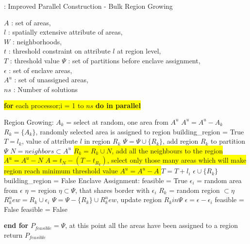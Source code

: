 \documentclass[conference]{IEEEtran}
\begin{document}
\begin{algorithm}
\renewcommand{\thealgorithm}{}
\scriptsize
\caption{: Improved Parallel Construction - Bulk Region Growing~\cite{r1}}
$A$ : set of areas,\\
$l$ : spatially extensive attribute of areas,\\
$W$ : neighborhoods,\\
$t$ : threshold constraint on attribute $l$ at region level,\\
$T$ : threshold value
$\Psi$ : set of partitions before enclave assignment,\\
$\epsilon$ : set of enclave areas,\\
$A^u$ : set of unassigned areas,\\
$ns$ : Number of solutions\\
\begin{algorithmic}
\vbox{\colorbox{yellow}{\vbox{\STATE \textbf{for} each processor;i = 1 to $ns$ \textbf{do in parallel}}}} 
\begin{ALC@g}
	\STATE Region Growing:
		\STATE $A_k$ = select at random, one area from $A^u$
		\STATE $A^u = A^u - A_k$
		\STATE $R_k = \{A_k\}$, randomly selected area is assigned to region
		\STATE building\_region = True
		\STATE $T = l_k$, value of attribute $l$ in region $R_k$
				\STATE $\Psi = \Psi \cup \{R_k\}$, add region $R_k$ to partition $\Psi$
			\ELSE
				\STATE $N = neighbors \subset A^u$%
					\vbox{\colorbox{yellow}{\vbox{
						\STATE $R_k = R_k \cup N$, add all the neighbours to the region 
						\STATE $A^u = A^u - N$
					\ELSE
						\STATE $A = t_N - (T - t_{R_k})$, select only those many areas which will make region reach minimum threshold value
						\STATE $A^u = A^u - A$
					\ENDIF}}}
					\STATE $T = T + l_i$
				\ELSE
					\STATE $\epsilon \cup \{R_k\}$
					\STATE building\_region = False
				\ENDIF
			\ENDIF
		\ENDWHILE
	\ENDWHILE
	\STATE Enclave Assignment:
		\STATE feasible = True
			\STATE $\epsilon_i$ = random area from $\epsilon$
			\STATE $\eta$ = region $\eta \subset \Psi $, that shares border with $\epsilon_i$
				\STATE $R_k$ = random region $\subset \eta$
				\STATE $R_k^new = R_k \cup \epsilon_i$
				\STATE $\Psi = \Psi - \{R_k\} \cup R_k^new$, update region $R_k in \Psi$
				\STATE $\epsilon = \epsilon - \epsilon_i$
			\ELSE
				\STATE feasible = False
			\ENDIF
		\ENDWHILE
	\ELSE
		\STATE feasible = False
	\ENDIF
\end{ALC@g}
\STATE \textbf{end for}
\STATE $P_{feasible} = \Psi$, at this point all the areas have been assigned to a region
\STATE return $P_{feasible}$
\end{algorithmic}
\end{algorithm}
\end{document}
